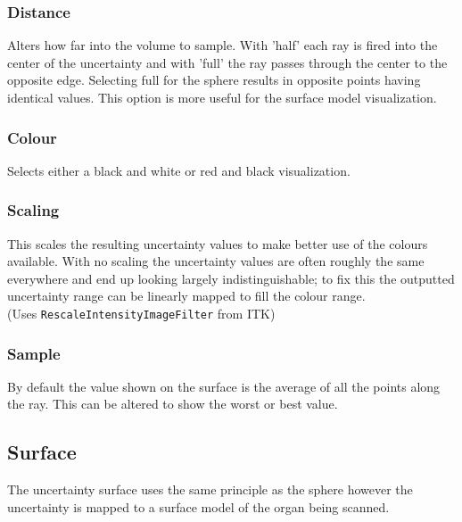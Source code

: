 \subsubsection{Distance}
Alters how far into the volume to sample. With 'half' each ray is fired into the center of the uncertainty and with 'full' the ray passes through the center to the opposite edge. Selecting full for the sphere results in opposite points having identical values. This option is more useful for the surface model visualization.

\subsubsection{Colour}
Selects either a black and white or red and black visualization.

\subsubsection{Scaling}
This scales the resulting uncertainty values to make better use of the colours available. With no scaling the uncertainty values are often roughly the same everywhere and end up looking largely indistinguishable; to fix this the outputted uncertainty range can be linearly mapped to fill the colour range.\\(Uses \texttt{RescaleIntensityImageFilter} from ITK)

\subsubsection{Sample}
By default the value shown on the surface is the average of all the points along the ray. This can be altered to show the worst or best value.


\clearpage
\subsection{Surface}\label{implementation:surface}
The uncertainty surface uses the same principle as the sphere however the uncertainty is mapped to a surface model of the organ being scanned.

